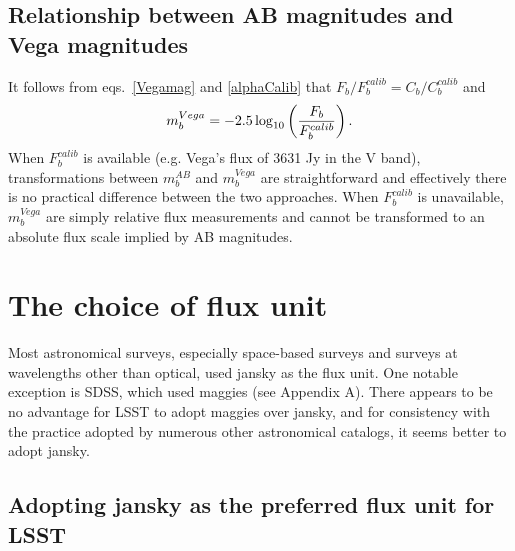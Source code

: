 \documentclass[DM,lsstdraft,toc,usenatbib]{lsstdoc}
\begin{document}
\subsection{Relationship between AB magnitudes and Vega magnitudes}

It follows from eqs.~\ref{Vegamag} and \ref{alphaCalib} that
$F_b/F^{calib}_{b} = C_b / C_b^{calib}$ and
\begin{equation}
\label{VegamagAB}
               m^{Vega}_b = -2.5\log_{10}\left({F_b \over F^{calib}_{b}}\right).
\end{equation}
When $F^{calib}_{b}$ is available (e.g. Vega's flux of 3631 Jy in the V band), transformations between
$m^{AB}_b$ and $m^{Vega}_b$ are straightforward and effectively there is no practical difference
between the two approaches. When $F^{calib}_{b}$ is unavailable, $m^{Vega}_b$ are simply relative flux measurements
and cannot be transformed to an absolute flux scale implied by AB magnitudes.


\section{The choice of flux unit}

Most astronomical surveys, especially space-based surveys and surveys
at wavelengths other than optical, used jansky as the flux unit.  One notable
exception is SDSS, which used maggies (see Appendix A). There appears to be
no advantage for LSST to adopt maggies over jansky, and for consistency
with the practice adopted by numerous other astronomical catalogs, it seems
better to adopt jansky.


\subsection{Adopting jansky as the preferred flux unit for LSST  \label{sec:Jy}}
\end{document}
